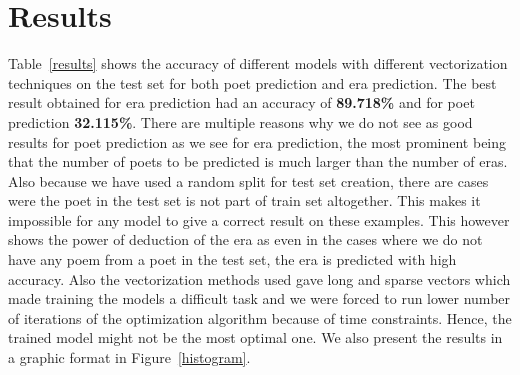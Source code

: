 \documentclass[11pt,a4paper]{article}
\begin{document}
\section{Results}
Table~\ref{results} shows the accuracy of different models with different vectorization techniques on the test set for both poet prediction and era prediction. The best result obtained for era prediction had an accuracy of \textbf{89.718\%} and for poet prediction \textbf{32.115\%}. There are multiple reasons why we do not see as good results for poet prediction as we see for era prediction, the most prominent being that the number of poets to be predicted is much larger than the number of eras. Also because we have used a random split for test set creation, there are cases were the poet in the test set is not part of train set altogether. This makes it impossible for any model to give a correct result on these examples. This however shows the power of deduction of the era as even in the cases where we do not have any poem from a poet in the test set, the era is predicted with high accuracy. Also the vectorization methods used gave long and sparse vectors which made training the models a difficult task and we were forced to run lower number of iterations of the optimization algorithm because of time constraints. Hence, the trained model might not be the most optimal one. We also present the results in a graphic format in Figure~\ref{histogram}.
\end{document}
